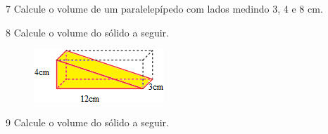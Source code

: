 \num{7} Calcule o volume de um paralelepípedo com lados medindo
3, 4 e 8 cm.





\vspace{2cm}

\num{8} Calcule o volume do sólido a seguir.

\begin{figure}[H]
\centering\includegraphics[width=.8\textwidth]{./imgSAEB_8_MAT/media/image52.png}
\end{figure}




\pagebreak

\num{9} Calcule o volume do sólido a seguir.

